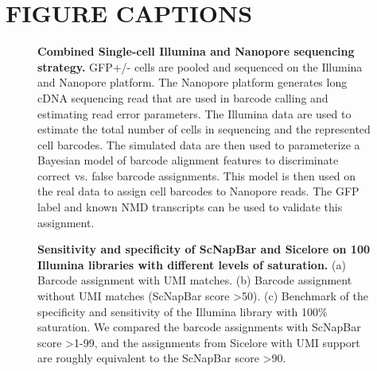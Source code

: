 \documentclass[times, 11pt, a4paper]{article}
\begin{document}
 

\newpage

\section*{FIGURE CAPTIONS}

  \begin{figure}[h!]
  \caption{\textbf{Combined Single-cell Illumina and Nanopore sequencing strategy.} GFP+/- cells are pooled and sequenced on the Illumina and Nanopore platform. The Nanopore platform generates long cDNA sequencing read that are used in barcode calling and estimating read error parameters. The Illumina data are used to estimate the total number of cells in sequencing and the represented cell barcodes. The simulated data are then used to parameterize a Bayesian model of barcode alignment features to discriminate correct vs. false barcode assignments. This model is then used on the real data to assign cell barcodes to Nanopore reads. The GFP label and known NMD transcripts can be used to validate this assignment. }
  \label{fig:graphicsummary}
      \end{figure}

\begin{figure}[h!]
     \centering
     \begin{subfigure}[t]{0.65\textwidth}
         \centering
     \end{subfigure}
     \hfill
     \begin{subfigure}[t]{0.3\textwidth}
         \centering
      \end{subfigure}
        \caption{\textbf{Sensitivity and specificity of ScNapBar and Sicelore on 100 Illumina libraries with different levels of saturation.} (a) Barcode assignment with UMI matches. (b) Barcode assignment without UMI matches (ScNapBar score \textgreater 50). (c) Benchmark of the specificity and sensitivity of the Illumina library with 100\% saturation. We compared the barcode assignments with ScNapBar score \textgreater 1-99, and the assignments from Sicelore with UMI support are roughly equivalent to the ScNapBar score \textgreater 90. }
         \label{fig:umimetrics}
\end{figure}
    
\end{document}

